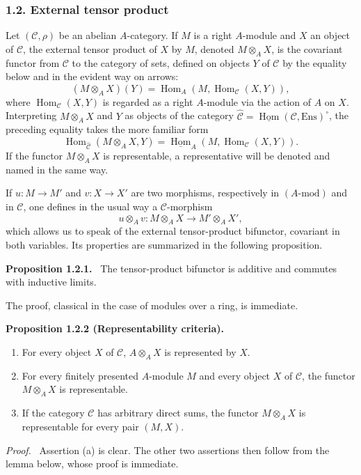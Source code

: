\documentclass[11pt]{article}
\providecommand{\uHom}{\underline{\Hom}}
\newenvironment{statement}[1]{\par\medskip\noindent\textbf{#1.}\ }{\par\medskip}
\newenvironment{prooftext}[1][Proof]{\par\noindent\emph{#1.}\ }{\par\medskip}
\DeclareMathOperator{\Hom}{Hom}
\providecommand{\Hom}{\operatorname{Hom}}
\providecommand{\Ens}{\mathrm{Ens}}
\providecommand{\cC}{\mathcal C}
\providecommand{\Ens}{\operatorname{Ens}}
\providecommand{\cC}{\mathcal C}
\providecommand{\Hom}{\operatorname{Hom}}
\begin{document}
\subsubsection*{1.2. External tensor product}
Let $(\cC,\rho)$ be an abelian $A$-category. If $M$ is a right $A$-module and $X$ an object of $\cC$, the external tensor product of $X$ by $M$, denoted $M\otimes_A X$, is the covariant functor from $\cC$ to the category of sets, defined on objects $Y$ of $\cC$ by the equality below and in the evident way on arrows:
\[
(M\otimes_A X)(Y)=\Hom_A(M,\Hom_{\cC}(X,Y)),
\]
where $\Hom_{\cC}(X,Y)$ is regarded as a right $A$-module via the action of $A$ on $X$. Interpreting $M\otimes_AX$ and $Y$ as objects of the category $\widehat{\cC}=\uHom(\cC,\Ens)^{\circ}$, the preceding equality takes the more familiar form
\[
\Hom_{\widehat{\cC}}(M\otimes_A X,Y)=\uHom_A(M,\Hom_{\cC}(X,Y)).
\]
If the functor $M\otimes_A X$ is representable, a representative will be denoted and named in the same way.

If $u:M\to M'$ and $v:X\to X'$ are two morphisms, respectively in $(A\text{-mod})$ and in $\cC$, one defines in the usual way a $\cC$-morphism
\[
u\otimes_A v:M\otimes_A X\longrightarrow M'\otimes_A X',
\]
which allows us to speak of the external tensor-product bifunctor, covariant in both variables. Its properties are summarized in the following proposition.

\begin{statement}{Proposition 1.2.1}
The tensor-product bifunctor is additive and commutes with inductive limits.
\end{statement}
The proof, classical in the case of modules over a ring, is immediate.

\begin{statement}{Proposition 1.2.2 (Representability criteria)}
\begin{enumerate}[label=(\alph*)]
\item For every object $X$ of $\cC$, $A\otimes_AX$ is represented by $X$.
\item For every finitely presented $A$-module $M$ and every object $X$ of $\cC$, the functor $M\otimes_AX$ is representable.
\item If the category $\cC$ has arbitrary direct sums, the functor $M\otimes_A X$ is representable for every pair $(M,X)$.
\end{enumerate}
\end{statement}

\begin{prooftext}[Proof]
Assertion (a) is clear. The other two assertions then follow from the lemma below, whose proof is immediate.
\end{prooftext}
\end{document}
